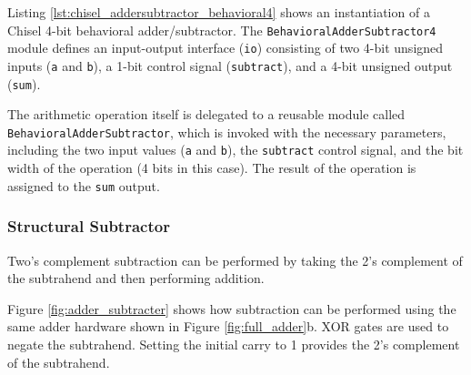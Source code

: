 {

Listing \ref{lst:chisel_addersubtractor_behavioral4} shows an instantiation of a Chisel 4-bit behavioral adder/subtractor. The \texttt{BehavioralAdderSubtractor4} module defines an input-output interface (\texttt{io}) consisting of two 4-bit unsigned inputs (\texttt{a} and \texttt{b}), a 1-bit control signal (\texttt{subtract}), and a 4-bit unsigned output (\texttt{sum}). 

The arithmetic operation itself is delegated to a reusable module called \texttt{BehavioralAdderSubtractor}, which is invoked with the necessary parameters, including the two input values (\texttt{a} and \texttt{b}), the \texttt{subtract} control signal, and the bit width of the operation (4 bits in this case). The result of the operation is assigned to the \texttt{sum} output. 

}%

\subsubsection{Structural Subtractor}
Two's complement subtraction can be performed by taking the 2's complement of the subtrahend and then performing addition.



Figure \ref{fig:adder_subtracter} shows how subtraction can be performed using the same adder hardware shown in Figure \ref{fig:full_adder}b. XOR gates are used to negate the subtrahend. Setting the initial carry to 1 provides the 2's complement of the subtrahend.

